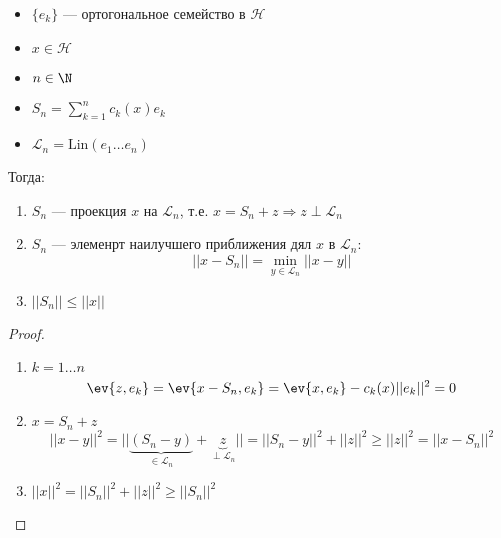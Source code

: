 \begin{theorem}\itemfix
    \begin{itemize}
        \item \(\{e_k\} \) --- ортогональное семейство в \(\mathcal{H}\)
        \item \(x \in \mathcal{H}\)
        \item \(n \in \N\)
        \item \(S_n = \sum_{k = 1}^n c_k(x) e_k\)
        \item \(\mathcal{L}_n = \text{Lin}(e_1 \dots e_n)\)
    \end{itemize}

    Тогда:
    \begin{enumerate}
        \item \(S_n\) --- проекция \(x\) на \(\mathcal{L}_n\), т.е. \(x = S_n + z \Rightarrow z \perp \mathcal{L}_n\)
        \item \(S_n\) --- элеменрт наилучшего приближения дял \(x\) в \(\mathcal{L}_n\):
              \[||x - S_n|| = \min_{y \in \mathcal{L}_n} ||x - y||\]
        \item \(||S_n|| \leq ||x||\)
    \end{enumerate}
\end{theorem}
\begin{proof}\itemfix
    \begin{enumerate}
        \item \(k = 1\dots n\)
              \[\ev{z, e_k} = \ev{x - S_n, e_k} = \ev{x, e_k} - c_k(x) ||e_k||^2 = 0\]
        \item \(x = S_n + z\)
              \[||x - y||^2 = ||\underbrace{(S_n - y)}_{\in \mathcal{L}_n} + \underbrace{z}_{\perp \mathcal{L}_n}|| = ||S_n - y||^2 + ||z||^2 \geq ||z||^2 = ||x - S_n||^2\]
        \item \(||x||^2 = ||S_n||^2 + ||z||^2 \geq ||S_n||^2\)
    \end{enumerate}
\end{proof}
